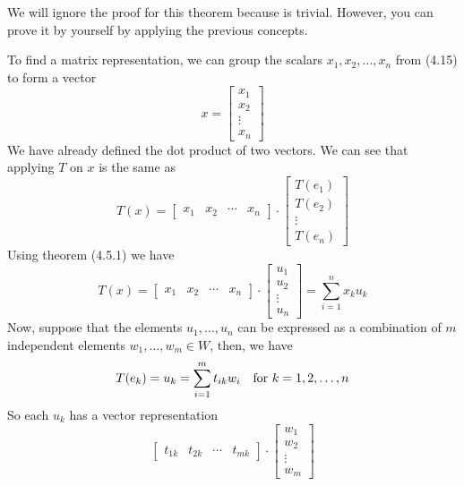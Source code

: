\documentclass{book}
\begin{document}
We will ignore the proof for this theorem because is trivial. However, you can
prove it by yourself by applying the previous concepts.

To find a matrix representation, we can group the scalars $x_1, x_2,\dots,x_n$
from (4.15) to form a vector
\begin{equation}
    x = \left[
        \begin{matrix}
            x_1 \\ x_2 \\ \vdots \\ x_n
        \end{matrix}
        \right]
\end{equation}
We have already defined the dot product of two vectors. We can see that applying $T$ on $x$ is the same as
\begin{equation}
    T(x) = \left[
        \begin{matrix}
            x_1 & x_2 & \cdots & x_n
        \end{matrix}
        \right]\cdot  \left[
        \begin{matrix}
            T(e_1) \\ T(e_2) \\ \vdots \\ T(e_n)
        \end{matrix}
        \right]
\end{equation}
Using theorem (4.5.1) we have
\begin{equation}
    T(x) = \left[
        \begin{matrix}
            x_1 & x_2 & \cdots & x_n
        \end{matrix}
        \right]\cdot  \left[
        \begin{matrix}
            u_1 \\ u_2 \\ \vdots \\ u_n
        \end{matrix}
        \right] = \sum_{i=1}^{n}{x_k u_k}
\end{equation}
Now, suppose that the elements $u_1,\dots,u_n$ can be expressed as a combination of $m$ independent elements $w_1,\dots,w_m\in W$,
then, we have
\begin{equation}
    T(e_k) = u_k = \sum_{i=1}^{m}{t_{ik}w_i}\quad \textnormal{for }k=1,2,\dots,n
\end{equation}
So each $u_k$ has a vector representation
\begin{equation*}
    \left[
        \begin{matrix}
            t_{1k} & t_{2k} & \cdots & t_{mk}
        \end{matrix}
        \right]\cdot  \left[
        \begin{matrix}
            w_1 \\ w_2 \\ \vdots \\ w_m
        \end{matrix}
        \right]
\end{equation*}
\end{document}
